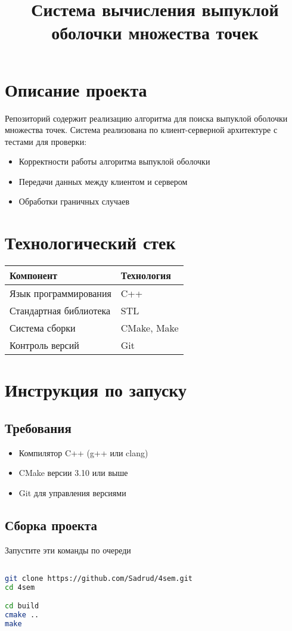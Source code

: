 \documentclass{article}
\begin{document}
\title{Система вычисления выпуклой оболочки множества точек}
\author{}
\date{}
\maketitle

\section{Описание проекта}
Репозиторий содержит реализацию алгоритма для поиска выпуклой оболочки множества точек. Система реализована по клиент-серверной архитектуре с тестами для проверки:

\begin{itemize}
    \item Корректности работы алгоритма выпуклой оболочки
    \item Передачи данных между клиентом и сервером
    \item Обработки граничных случаев
\end{itemize}

\section{Технологический стек}
\begin{tabular}{|l|l|}
\hline
\textbf{Компонент} & \textbf{Технология} \\
\hline
Язык программирования & C++ \\
Стандартная библиотека & STL \\
Система сборки & CMake, Make \\
Контроль версий & Git \\
\hline
\end{tabular}

\section{Инструкция по запуску}
\subsection{Требования}
\begin{itemize}
    \item Компилятор C++ (g++ или clang)
    \item CMake версии 3.10 или выше
    \item Git для управления версиями
\end{itemize}

\subsection{Сборка проекта}
Запустите эти команды по очереди
\begin{lstlisting}[language=bash]

git clone https://github.com/Sadrud/4sem.git
cd 4sem

cd build
cmake ..
make
\end{lstlisting}
\end{document}
